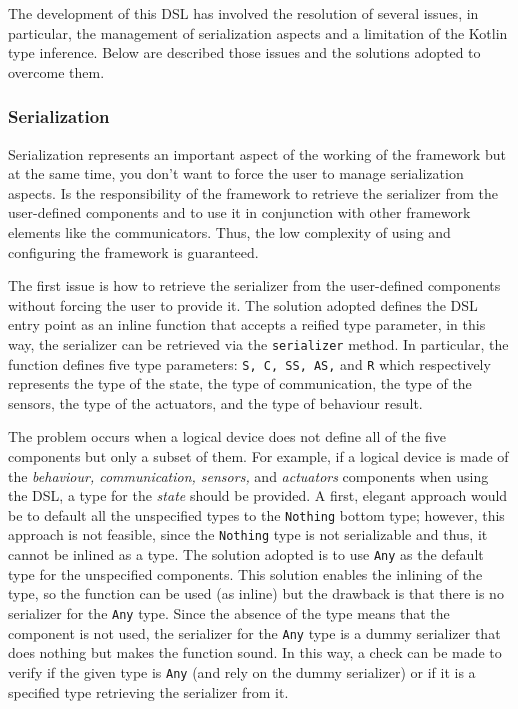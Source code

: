 The development of this DSL has involved the resolution of several issues, in particular, the management of serialization aspects and a limitation of
the Kotlin type inference. Below are described those issues and the solutions adopted to overcome them.

\subsubsection{Serialization}

Serialization represents an important aspect of the working of the framework but at the same time, you don't want to force the user to manage
serialization aspects. Is the responsibility of the framework to retrieve the serializer from the user-defined components and to use it in
conjunction with other framework elements like the communicators. Thus, the low complexity of using and configuring the framework is guaranteed.

The first issue is how to retrieve the serializer from the user-defined components without forcing the user to provide it. The solution adopted
defines the DSL entry point as an inline function that accepts a reified type parameter, in this way, the serializer can be retrieved via the
\texttt{serializer} method. In particular, the function defines five type parameters: \texttt{S, C, SS, AS,} and \texttt{R} which respectively
represents the type of the state, the type of communication, the type of the sensors, the type of the actuators, and the type of behaviour result.

The problem occurs when a logical device does not define all of the five components but only a subset of them.
For example, if a logical device is made of the \emph{behaviour, communication, sensors,} and \emph{actuators} components when using the DSL, a type
for the \emph{state} should be provided. A first, elegant approach would be to default all the unspecified types to the \texttt{Nothing} bottom type;
however, this approach is not feasible, since the \texttt{Nothing} type is not serializable and thus, it cannot be inlined as a type.
The solution adopted is to use \texttt{Any} as the default type for the unspecified components. This solution enables the inlining of the type,
so the function can be used (as inline) but the drawback is that there is no serializer for the \texttt{Any} type.
Since the absence of the type means that the component is not used, the serializer for the \texttt{Any} type is a dummy serializer that does
nothing but makes the function sound. In this way, a check can be made to verify if the given type is \texttt{Any} (and rely on the dummy serializer)
or if it is a specified type retrieving the serializer from it.

